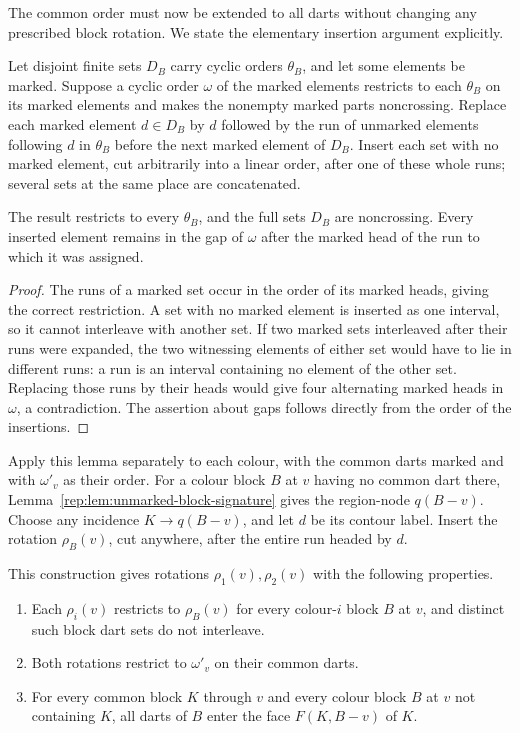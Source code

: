 The common order must now be extended to all darts without changing any
prescribed block rotation.  We state the elementary insertion argument
explicitly.

\begin{lemma}
\label{rep:lem:private-runs}
Let disjoint finite sets $D_B$ carry cyclic orders $\theta_B$, and let some
elements be marked.  Suppose a cyclic order $\omega$ of the marked elements
restricts to each $\theta_B$ on its marked elements and makes the nonempty
marked parts noncrossing.  Replace each marked element $d\in D_B$ by $d$
followed by the run of unmarked elements following $d$ in $\theta_B$ before
the next marked element of $D_B$.  Insert each set with no marked element,
cut arbitrarily into a linear order, after one of these whole runs; several
sets at the same place are concatenated.

The result restricts to every $\theta_B$, and the full sets $D_B$ are
noncrossing.  Every inserted element remains in the gap of $\omega$ after
the marked head of the run to which it was assigned.
\end{lemma}

\begin{proof}
The runs of a marked set occur in the order of its marked heads, giving the
correct restriction.  A set with no marked element is inserted as one
interval, so it cannot interleave with another set.  If two marked sets
interleaved after their runs were expanded, the two witnessing elements
of either set would have to lie in different runs: a run is an interval
containing no element of the other set.  Replacing those runs by their
heads would give four alternating marked heads in $\omega$, a
contradiction.  The assertion about gaps follows directly from the order
of the insertions.
\end{proof}

Apply this lemma separately to each colour, with the common darts marked
and with $\omega'_v$ as their order.  For a colour block $B$ at $v$ having
no common dart there, Lemma~\ref{rep:lem:unmarked-block-signature} gives the
region-node $q(B-v)$.  Choose any incidence
$K\to q(B-v)$, and let $d$ be its contour label.  Insert the rotation
$\rho_B(v)$, cut anywhere, after the entire run headed by $d$.

\begin{lemma}
\label{rep:lem:local-rotations}
This construction gives rotations $\rho_1(v),\rho_2(v)$ with the following
properties.
\begin{enumerate}
\item Each $\rho_i(v)$ restricts to $\rho_B(v)$ for every colour-$i$ block
$B$ at $v$, and distinct such block dart sets do not interleave.
\item Both rotations restrict to $\omega'_v$ on their common darts.
\item For every common block $K$ through $v$ and every colour block $B$
at $v$ not containing $K$, all darts of $B$ enter the face
$F(K,B-v)$ of $K$.
\end{enumerate}
\end{lemma}

